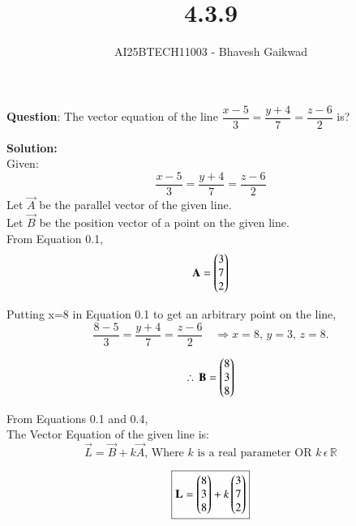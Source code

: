 \documentclass[journal]{IEEEtran}
\begin{document}

\vspace{3cm}

\title{4.3.9}
\author{AI25BTECH11003 - Bhavesh Gaikwad}
{\let\newpage\relax\maketitle}

\renewcommand{\thefigure}{\theenumi}
\renewcommand{\thetable}{\theenumi}
\setlength{\intextsep}{10pt} 


\renewcommand{\thetable}{\theenumi}


\textbf{Question}: The vector equation of the line $\dfrac{x-5}{3} = \dfrac{y+4}{7} = \dfrac{z-6}{2}$ is?

\textbf{Solution:}\\
Given: 
\begin{equation}
\dfrac{x-5}{3} = \dfrac{y+4}{7} = \dfrac{z-6}{2}
\end{equation}
Let $\vec{A}$ be the parallel vector of the given line.\\
Let $\vec{B}$ be the position vector of a point on the given line.\\

From Equation 0.1,
\begin{equation}
    \mathbf{A} = \begin{pmatrix}3 \\ 7 \\ 2\end{pmatrix}
\end{equation}

Putting x=8 in Equation 0.1 to get an arbitrary point on the line,
\begin{equation}
\dfrac{8-5}{3} = \dfrac{y+4}{7} = \dfrac{z-6}{2}
\quad \Rightarrow x=8, \, y = 3, \, z=8.
\end{equation}

\begin{equation}
    \therefore \, \mathbf{B} = \begin{pmatrix}8 \\ 3 \\ 8\end{pmatrix}
\end{equation}

From Equations 0.1 and 0.4,\\
The Vector Equation of the given line is: 
\begin{equation}
\vec{L} = \vec{B} + k\vec{A}    
\text{, Where } k \text{ is a real parameter OR } k \, \epsilon \, \mathbb{R}
\end{equation}


\begin{equation}
\boxed{\mathbf{L} =\begin{pmatrix}8 \\ 3 \\ 8\end{pmatrix} +  k\begin{pmatrix}3 \\ 7 \\ 2\end{pmatrix}}
\end{equation}
\end{document}
